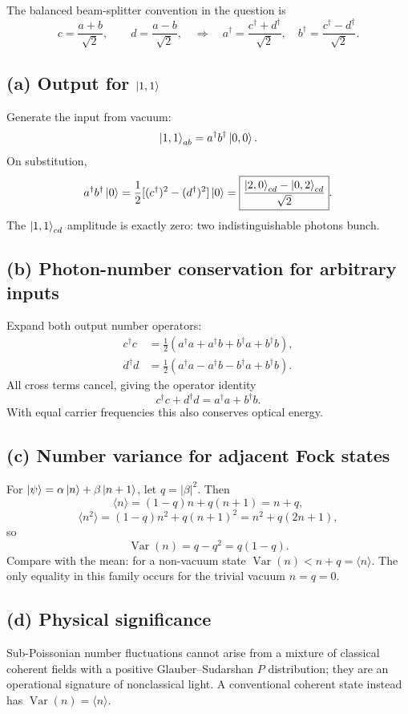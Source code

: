 
The balanced beam-splitter convention in the question is
\[
c=\frac{a+b}{\sqrt2},\qquad d=\frac{a-b}{\sqrt2},
\quad\Longrightarrow\quad
a^\dagger=\frac{c^\dagger+d^\dagger}{\sqrt2},
\quad b^\dagger=\frac{c^\dagger-d^\dagger}{\sqrt2}.
\]
\subsection*{(a) Output for \(\left\lvert 1,1\right\rangle\)}
Generate the input from vacuum:
\[
\left\lvert 1,1\right\rangle_{ab}=a^\dagger b^\dagger\left\lvert 0,0\right\rangle.
\]
On substitution,
\[
a^\dagger b^\dagger\left\lvert 0\right\rangle
=\frac12[(c^\dagger)^2-(d^\dagger)^2]\left\lvert 0\right\rangle
=\boxed{\frac{\left\lvert 2,0\right\rangle_{cd}-\left\lvert 0,2\right\rangle_{cd}}{\sqrt2}}.
\]
The \(\left\lvert 1,1\right\rangle_{cd}\) amplitude is exactly zero:
two indistinguishable photons bunch.

\subsection*{(b) Photon-number conservation for arbitrary inputs}
Expand both output number operators:
\begin{align*}
c^\dagger c&=\tfrac12
(a^\dagger a+a^\dagger b+b^\dagger a+b^\dagger b),\\
d^\dagger d&=\tfrac12
(a^\dagger a-a^\dagger b-b^\dagger a+b^\dagger b).
\end{align*}
All cross terms cancel, giving the operator identity
\[
\boxed{c^\dagger c+d^\dagger d=a^\dagger a+b^\dagger b}.
\]
With equal carrier frequencies this also conserves optical energy.

\subsection*{(c) Number variance for adjacent Fock states}
For \(\left\lvert \psi\right\rangle=\alpha\left\lvert n\right\rangle+\beta\left\lvert n+1\right\rangle\),
let \(q=|\beta|^2\). Then
\[
\langle n\rangle=(1-q)n+q(n+1)=n+q,
\]
\[
\langle n^2\rangle=(1-q)n^2+q(n+1)^2
=n^2+q(2n+1),
\]
so
\[
\boxed{\operatorname{Var}(n)=q-q^2=q(1-q)}.
\]
Compare with the mean: for a non-vacuum state
\(\operatorname{Var}(n)<n+q=\langle n\rangle\).
The only equality in this family occurs for the
trivial vacuum \(n=q=0\).

\subsection*{(d) Physical significance}
Sub-Poissonian number fluctuations cannot arise from
a mixture of classical coherent fields with a positive
Glauber--Sudarshan \(P\) distribution; they are an
operational signature of nonclassical light.
A conventional coherent state instead has
\(\operatorname{Var}(n)=\langle n\rangle\).
